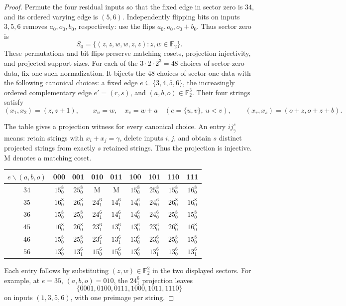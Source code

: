 \documentclass[11pt,letterpaper,onecolumn]{article}
\theoremstyle{plain}
\theoremstyle{definition}
\theoremstyle{remark}
\newcommand{\Ftwo}{\mathbb F_2}
\begin{document}
\begin{proof}
Permute the four residual inputs so that the fixed edge in sector zero is
\(34\), and its ordered varying edge is \((5,6)\).  Independently flipping
bits on inputs \(3,5,6\) removes \(a_0,o_0,b_0\), respectively: use the
flips \(a_0,o_0,o_0+b_0\).  Thus sector zero is
\[
 S_0=\{(z,z,w,w,z,z):z,w\in\Ftwo\}.
\]
These permutations and bit flips preserve matching cosets, projection
injectivity, and projected support sizes.  For each of the
\(3\cdot2\cdot2^3=48\) choices of sector-zero data, fix one such
normalization.  It bijects the \(48\) choices of sector-one data with the
following canonical choices: a fixed edge \(e\subseteq\{3,4,5,6\}\),
the increasingly ordered complementary edge \(e'=(r,s)\), and
\((a,b,o)\in\Ftwo^3\).  Their four strings satisfy
\[
 (x_1,x_2)=(z,z+1),\qquad
 x_u=w,\quad x_v=w+a\quad(e=\{u,v\},\ u<v),\qquad
 (x_r,x_s)=(o+z,o+z+b).
\]

The table gives a projection witness for every canonical choice.  An
entry \(ij_\gamma^s\) means: retain strings with \(x_i+x_j=\gamma\),
delete inputs \(i,j\), and obtain \(s\) distinct projected strings from
exactly \(s\) retained strings.  Thus the projection is injective.
\(\mathrm M\) denotes a matching coset.
\begin{center}
\normalsize
\setlength{\tabcolsep}{4pt}
\begin{tabular}{c|cccccccc}
\toprule
\(e\backslash(a,b,o)\)&000&001&010&011&100&101&110&111\\
\midrule
\(34\)&\(15_0^8\)&\(25_0^8\)&\(\mathrm M\)&\(\mathrm M\)&\(15_0^8\)&\(25_0^8\)&\(15_0^8\)&\(16_0^8\)\\
\(35\)&\(16_0^8\)&\(26_0^8\)&\(24_1^6\)&\(14_1^6\)&\(14_0^6\)&\(24_0^6\)&\(26_0^8\)&\(16_0^8\)\\
\(36\)&\(15_0^8\)&\(25_0^8\)&\(24_1^6\)&\(14_1^6\)&\(14_0^6\)&\(24_0^6\)&\(25_0^8\)&\(15_0^8\)\\
\(45\)&\(16_0^8\)&\(26_0^8\)&\(23_1^6\)&\(13_1^6\)&\(13_0^6\)&\(23_0^6\)&\(26_0^8\)&\(16_0^8\)\\
\(46\)&\(15_0^8\)&\(25_0^8\)&\(23_1^6\)&\(13_1^6\)&\(13_0^6\)&\(23_0^6\)&\(25_0^8\)&\(15_0^8\)\\
\(56\)&\(13_0^6\)&\(13_1^6\)&\(15_0^6\)&\(15_0^6\)&\(13_0^6\)&\(13_1^6\)&\(13_0^6\)&\(13_1^6\)\\
\bottomrule
\end{tabular}
\end{center}
Each entry follows by substituting \((z,w)\in\Ftwo^2\) in the two
displayed sectors.  For example, at \(e=35\), \((a,b,o)=010\), the
\(24_1^6\) projection leaves
\[
 \{0001,0100,0111,1000,1011,1110\}
\]
on inputs \((1,3,5,6)\), with one preimage per string.


\end{proof}
\end{document}
